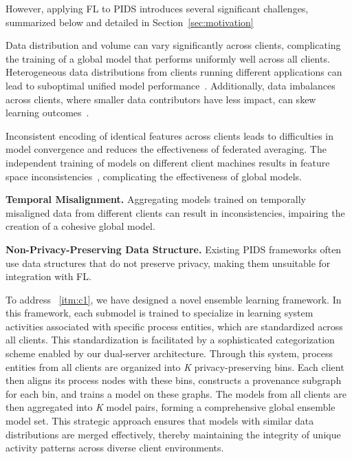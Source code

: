 However, applying FL to PIDS introduces several significant challenges, summarized below and detailed in Section~\ref{sec:motivation}

\begin{enumerate}[itemsep=0.1em, parsep=0em, topsep=0em]
   Data distribution and volume can vary significantly across clients, complicating the training of a global model that performs uniformly well across all clients. Heterogeneous data distributions from clients running different applications can lead to suboptimal unified model performance~\cite{qu2022rethinking}. Additionally, data imbalances across clients, where smaller data contributors have less impact, can skew learning outcomes~\cite{duan2020self}.

   Inconsistent encoding of identical features across clients leads to difficulties in model convergence and reduces the effectiveness of federated averaging. The independent training of \wordvec models on different client machines results in feature space inconsistencies~\cite{zhou2023fedfa}, complicating the effectiveness of global \gnnshort models.

   {\bf Temporal Misalignment.} Aggregating models trained on temporally misaligned data from different clients can result in inconsistencies, impairing the creation of a cohesive global model.
  
   {\bf Non-Privacy-Preserving Data Structure.} Existing PIDS frameworks often use data structures that do not preserve privacy, making them unsuitable for integration with FL.
\end{enumerate}



To address ~\ref{itm:c1}, we have designed a novel ensemble learning framework. In this framework, each submodel is trained to specialize in learning system activities associated with specific process entities, which are standardized across all clients. This standardization is facilitated by a sophisticated categorization scheme enabled by our dual-server architecture. Through this system, process entities from all clients are organized into \textit{K} privacy-preserving bins. Each client then aligns its process nodes with these bins, constructs a provenance subgraph for each bin, and trains a \gnnshort model on these graphs. The models from all clients are then aggregated into \textit{K} model pairs, forming a comprehensive global ensemble model set. This strategic approach ensures that models with similar data distributions are merged effectively, thereby maintaining the integrity of unique activity patterns across diverse client environments.

